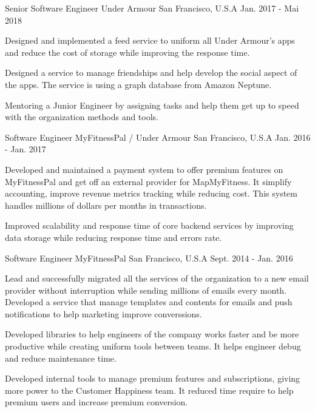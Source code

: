 \begin{cventries}
  \cventry
    {Senior Software Engineer}
    {Under Armour}
    {San Francisco, U.S.A}
    {Jan. 2017 - Mai 2018}
    {
      \begin{cvitems}
        \item {Designed and implemented a feed service to uniform all Under Armour's  apps and reduce the cost of storage while improving the response time.}
        \item {Designed a service to manage friendships and help develop the social aspect of the apps. The service is using a graph database from Amazon Neptune. }
         \item {Mentoring a Junior Engineer by assigning tasks and help them get up to speed with the organization methods and tools.}
      \end{cvitems}
    }

  \cventry
    {Software Engineer}
    {MyFitnessPal / Under Armour}
    {San Francisco, U.S.A}
    {Jan. 2016 - Jan. 2017}
    {
      \begin{cvitems}
        \item{Developed and maintained a payment system to offer premium features on MyFitnessPal and get off an external provider for MapMyFitness. It simplify accounting, improve revenue metrics tracking while reducing cost. This system handles millions of dollars per months in transactions. }
	\item{Improved scalability and response time of core backend services by improving data storage while reducing response time and errors rate.}
      \end{cvitems}
    }
    
  \cventry
    {Software Engineer}
    {MyFitnessPal}
    {San Francisco, U.S.A}
    {Sept. 2014 - Jan. 2016}
    {
      \begin{cvitems}
        \item {Lead and successfully migrated all the services of the organization to a new email provider without interruption while sending millions of emails every month. Developed a service that manage templates and contents for emails and push notifications to help marketing improve converssions.}
        \item {Developed libraries to help engineers of the company works faster and be more productive while creating uniform tools between teams. It helps engineer debug and reduce maintenance time.}
        \item{Developed internal tools to manage premium features and subscriptions, giving more power to the Customer Happiness team. It reduced time require to help premium users and increase premium conversion.}
      \end{cvitems}
    }



\end{cventries}
